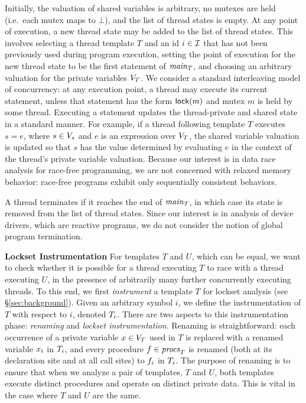 Initially, the valuation of shared variables is arbitrary, no mutexes are held (i.e.\ each mutex maps to $\bot$), and the list of thread states is empty.
%
At any point of execution, a new thread state may be added to the list of thread states.  This involves selecting a thread template $T$ and an id $i \in \mathcal{I}$ that has not been previously used during program execution, setting the point of execution for the new thread state to be the first statement of $\mathit{main}_{T}$, and choosing an arbitrary valuation for the private variables $V_{T}$.
%
We consider a standard interleaving model of concurrency: at any execution point, a thread may execute its current statement, unless that statement has the form $\mathsf{lock}(m)$ and mutex $m$ is held by some thread.  Executing a statement updates the thread-private and shared state in a standard manner.  For example, if a thread following template $T$ executes $s = e$, where $s \in V_s$ and $e$ is an expression over $V_{T}$, the shared variable valuation is updated so that $s$ has the value determined by evaluating $e$ in the context of the thread's private variable valuation.  Because our interest is in data race analysis for race-free programming, we are not concerned with relaxed memory behavior: race-free programs exhibit only sequentially consistent behaviors.

A thread terminates if it reaches the end of $\mathit{main}_{T}$, in which case its state is removed from the list of thread states.  Since our interest is in analysis of device drivers, which are reactive programs, we do not consider the notion of global program termination.

\noindent\textbf{Lockset Instrumentation }
%
For templates $T$ and $U$, which can be equal, we want to check whether it is possible for a thread executing $T$ to race with a thread executing $U$, in the presence of arbitrarily many further concurrently executing threads.
%
To this end, we first \emph{instrument} a template $T$ for lockset analysis (see \S\ref{sec:background}).  Given an arbitrary symbol $i$, we define the instrumentation of $T$ with respect to $i$, denoted $T_{i}$.  There are two aspects to this instrumentation phase: \emph{renaming} and \emph{lockset instrumentation}.
%
Renaming is straightforward: each occurrence of a private variable $x \in V_{T}$ used in $T$ is replaced with a renamed variable $x_{i}$ in $T_{i}$, and every procedure $f \in \mathit{procs}_{T}$ is renamed (both at its declaration site and at all call sites) to $f_{i}$ in $T_{i}$.  The purpose of renaming is to ensure that when we analyze a pair of templates, $T$ and $U$, both templates execute distinct procedures and operate on distinct private data.  This is vital in the case where $T$ and $U$ are the same.

